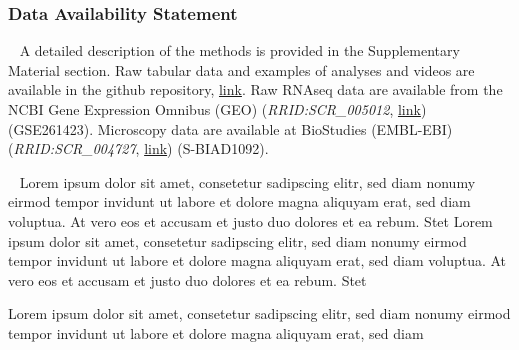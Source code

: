 
\subsubsection*{Data Availability Statement}
\ %
A detailed description of the methods is provided in the Supplementary Material section. Raw
tabular data and examples of analyses and videos are available in the github repository, \href{https://github.com/markur4/Supplemental-INA-6-Subpopulations-and-Aggregation-Detachment-Dynamics}{link}.
Raw RNAseq data are available from the NCBI Gene Expression Omnibus (GEO)
(\textit{RRID:SCR\_005012}, \href{https://www.ncbi.nlm.nih.gov/geo/query/acc.cgi?acc=GSE261423}{link}) (GSE261423). Microscopy data are available at BioStudies
(EMBL-EBI) (\textit{RRID:SCR\_004727}, \href{https://www.ebi.ac.uk/biostudies/bioimages/studies/S-BIAD1092?key=69bafe9c-74ff-492b-9e68-bd42655c4d1b}{link}) (S-BIAD1092).

\newpage

\ %
Lorem ipsum dolor sit amet, consetetur sadipscing elitr, sed diam nonumy
eirmod tempor invidunt ut labore et dolore magna aliquyam erat, sed diam
voluptua. At vero eos et accusam et justo duo dolores et ea rebum. Stet
Lorem ipsum dolor sit amet, consetetur sadipscing elitr, sed diam nonumy
eirmod tempor invidunt ut labore et dolore magna aliquyam erat, sed diam
voluptua. At vero eos et accusam et justo duo dolores et ea rebum. Stet



Lorem ipsum dolor sit amet, consetetur sadipscing elitr, sed diam nonumy
eirmod tempor invidunt ut labore et dolore magna aliquyam erat, sed diam


